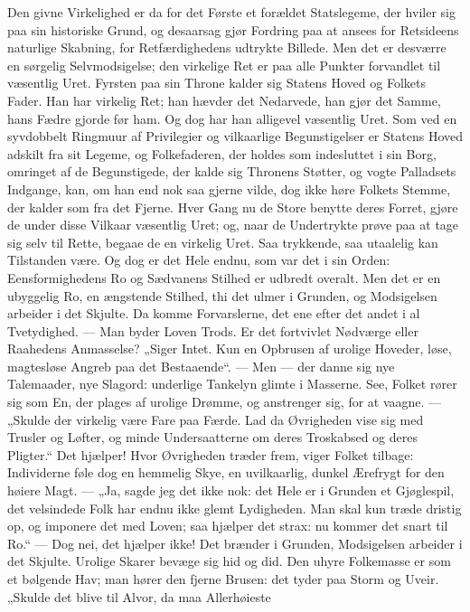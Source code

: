 \documentclass[12pt,a4paper]{book}
\begin{document}
Den givne Virkelighed er da for det Første et forældet Statslegeme, der hviler
sig paa sin historiske Grund, og desaarsag gjør Fordring paa at ansees for
Retsideens naturlige Skabning, for Retfærdighedens udtrykte Billede. Men det er
desværre en sørgelig Selvmodsigelse; den virkelige Ret er paa alle Punkter
forvandlet til væsentlig Uret. Fyrsten paa sin Throne kalder sig Statens Hoved og
Folkets Fader. Han har virkelig Ret; han hævder det Nedarvede, han gjør det
Samme, hans Fædre gjorde før ham. Og dog har han alligevel væsentlig Uret. Som
ved en syvdobbelt Ringmuur af Privilegier og vilkaarlige Begunstigelser er
Statens Hoved adskilt fra sit Legeme, og Folkefaderen, der holdes som indesluttet
i sin Borg, omringet af de Begunstigede, der kalde sig Thronens Støtter, og vogte
Palladsets Indgange, kan, om han end nok saa gjerne vilde, dog ikke høre Folkets
Stemme, der kalder som fra det Fjerne. Hver Gang nu de Store benytte deres
Forret, gjøre de under disse Vilkaar væsentlig Uret; og, naar de Undertrykte
prøve paa at tage sig selv til Rette, begaae de en virkelig Uret. Saa trykkende,
saa utaalelig kan Tilstanden være. Og dog er det Hele endnu, som var det i sin
Orden: Eensformighedens Ro og Sædvanens Stilhed er udbredt overalt. Men det er en
ubyggelig Ro, en ængstende Stilhed, thi det ulmer i Grunden, og Modsigelsen
arbeider i det Skjulte. Da komme Forvarslerne, det ene efter det andet i al
Tvetydighed. --- Man byder Loven Trods. Er det fortvivlet Nødværge eller
Raahedens Anmasselse? „Siger Intet. Kun en Opbrusen af urolige Hoveder, løse,
magtesløse Angreb paa det Bestaaende“. --- Men --- der danne sig nye Talemaader,
nye Slagord: underlige Tankelyn glimte i Masserne. See, Folket rører sig som En,
der plages af urolige Drømme, og anstrenger sig, for at vaagne. --- „Skulde der
virkelig være Fare paa Færde. Lad da Øvrigheden vise sig med Trusler og Løfter,
og minde Undersaatterne om deres Troskabsed og deres Pligter.“ Det hjælper! Hvor
Øvrigheden træder frem, viger Folket tilbage: Individerne føle dog en hemmelig
Skye, en uvilkaarlig, dunkel Ærefrygt for den høiere Magt. --- „Ja, sagde jeg det
ikke nok: det Hele er i Grunden et Gjøglespil, det velsindede Folk har endnu ikke
glemt Lydigheden.
Man skal kun træde dristig op, og imponere det med Loven; saa hjælper det strax:
nu kommer det snart til Ro.“ --- Dog nei, det hjælper ikke! Det brænder i
Grunden, Modsigelsen arbeider i det Skjulte. Urolige Skarer bevæge sig hid og
did. Den uhyre Folkemasse er som et bølgende Hav; man hører den fjerne Brusen:
det tyder paa Storm og Uveir. „Skulde det blive til Alvor, da maa Allerhøieste
\end{document}
